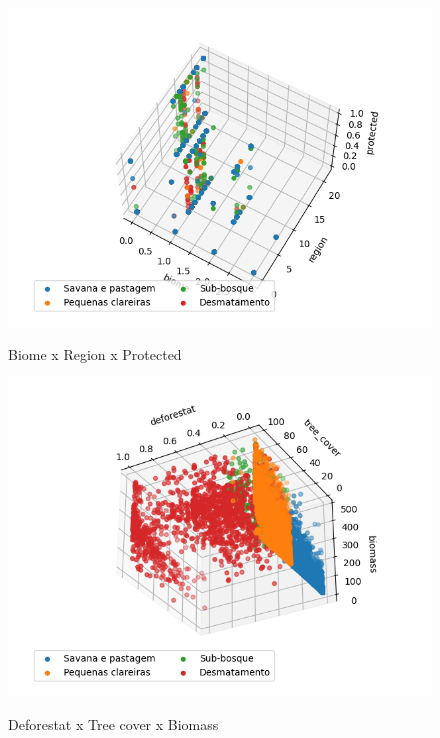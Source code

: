 \begin{multicols}{2}
\begin{figure}[H]
    \caption{Biome x Region x Protected}
     
    \centering 
    \includegraphics[width=1.1\linewidth]{tg1/figuras/biomexregionxprotected-60--60.png}
    \label{figura:two}
\end{figure}

\begin{figure}[H]
    \caption{Deforestat x Tree cover x Biomass}
     
    \centering 
    \includegraphics[width=1.1\linewidth]{tg1/figuras/deforestatxtree_coverxbiomass---30--120.png}
    \label{figura:three}
\end{figure}


\end{multicols}
